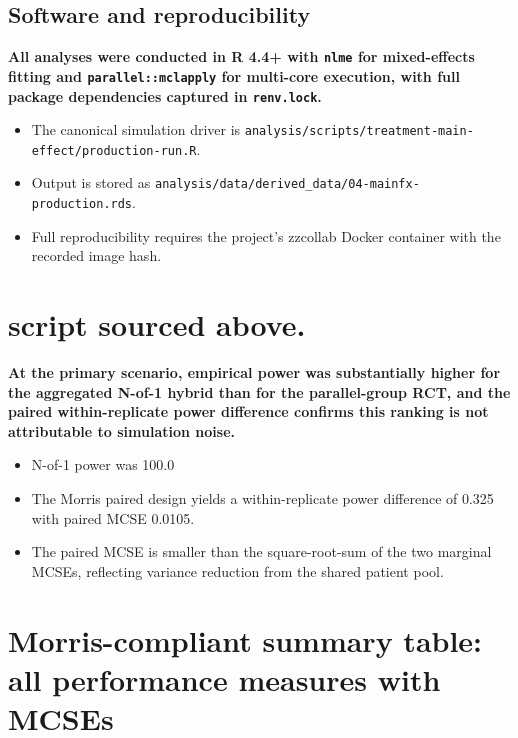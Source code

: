 \documentclass[
  11pt,
]{article}
\begin{document}
\subsection{Software and reproducibility}\label{software-and-reproducibility}

\textbf{All analyses were conducted in R 4.4+ with \texttt{nlme} for mixed-effects fitting and \texttt{parallel::mclapply} for multi-core execution, with full package dependencies captured in \texttt{renv.lock}.}

\begin{itemize}\setlength{\itemsep}{2pt}\setlength{\parskip}{0pt}
\item The canonical simulation driver is \texttt{analysis/scripts/treatment-main-effect/production-run.R}.
\item Output is stored as \texttt{analysis/data/derived\_data/04-mainfx-production.rds}.
\item Full reproducibility requires the project's zzcollab Docker container with the recorded image hash.
\end{itemize}

\section{script sourced above.}\label{script-sourced-above.}

\textbf{At the primary scenario, empirical power was substantially higher for the aggregated N-of-1 hybrid than for the parallel-group RCT, and the paired within-replicate power difference confirms this ranking is not attributable to simulation noise.}

\begin{itemize}\setlength{\itemsep}{2pt}\setlength{\parskip}{0pt}
\item N-of-1 power was 100.0%
\item The Morris paired design yields a within-replicate power difference of 0.325 with paired MCSE 0.0105.
\item The paired MCSE is smaller than the square-root-sum of the two marginal MCSEs, reflecting variance reduction from the shared patient pool.
\end{itemize}

\section{Morris-compliant summary table: all performance measures with MCSEs}\label{morris-compliant-summary-table-all-performance-measures-with-mcses}
\end{document}
